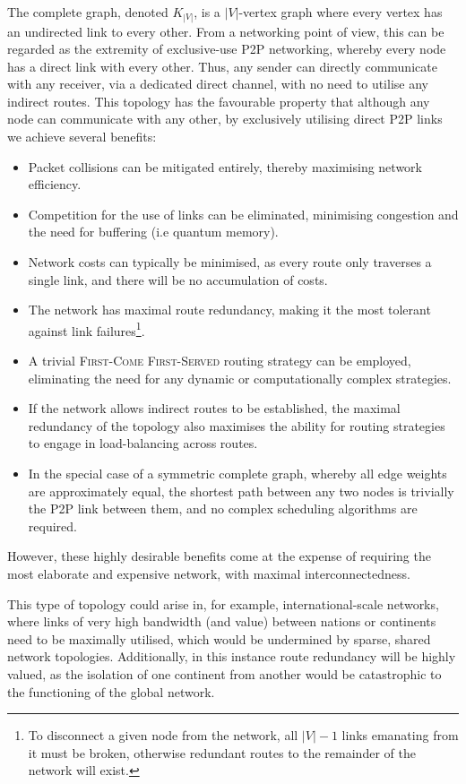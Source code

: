 \documentclass[aps, rmp, twocolumn, amsmath, amssymb, nofootinbib, superscriptaddress, longbibliography, floatfix, table-of-contents, eqsecnum]{revtex4-1}
\begin{document}
The complete graph, denoted $K_{|V|}$, is a $|V|$-vertex graph where every vertex has an undirected link to every other. From a networking point of view, this can be regarded as the extremity of exclusive-use P2P networking, whereby every node has a direct link with every other. Thus, any sender can directly communicate with any receiver, via a dedicated direct channel, with no need to utilise any indirect routes. This topology has the favourable property that although any node can communicate with any other, by exclusively utilising direct P2P links we achieve several benefits:
\begin{itemize}
\item Packet collisions can be mitigated entirely, thereby maximising network efficiency.
\item Competition for the use of links can be eliminated, minimising congestion and the need for buffering (i.e quantum memory).
\item Network costs can typically be minimised, as every route only traverses a single link, and there will be no accumulation of costs.
\item The network has maximal route redundancy, making it the most tolerant against link failures\footnote{To disconnect a given node from the network, all \mbox{$|V|-1$} links emanating from it must be broken, otherwise redundant routes to the remainder of the network will exist.}.
\item A trivial \textsc{First-Come First-Served} routing strategy can be employed, eliminating the need for any dynamic or computationally complex strategies.
\item If the network allows indirect routes to be established, the maximal redundancy of the topology also maximises the ability for routing strategies to engage in load-balancing across routes.
\item In the special case of a symmetric complete graph, whereby all edge weights are approximately equal, the shortest path between any two nodes is trivially the P2P link between them, and no complex scheduling algorithms are required.
\end{itemize}
However, these highly desirable benefits come at the expense of requiring the most elaborate and expensive network, with maximal interconnectedness.

This type of topology could arise in, for example, international-scale networks, where links of very high bandwidth (and value) between nations or continents need to be maximally utilised, which would be undermined by sparse, shared network topologies. Additionally, in this instance route redundancy will be highly valued, as the isolation of one continent from another would be catastrophic to the functioning of the global network.
\end{document}
